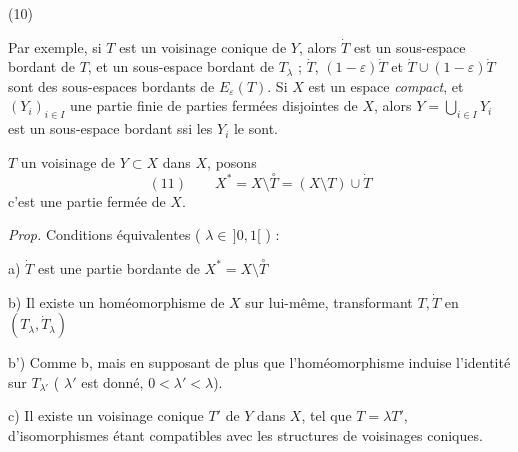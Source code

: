 \documentclass[11pt,a4paper]{article}
\begin{document}

(10)


Par exemple, si $T$ est un voisinage  conique  de \struck{\ill{}} $Y$, alors $\dot T$ est un sous-espace bordant de $T$, et un sous-espace bordant de $T_\lambda$ ;  $\dot T$, $(1-\varepsilon)\dot T$ et $\dot T\cup(1-\varepsilon)\dot T$ sont des sous-espaces bordants de $E_\varepsilon(T)$.  Si $X$ est un espace \emph{compact}, et $(Y_i)_{i\in I}$ une partie finie de parties fermées disjointes de $X$, alors $Y=\bigcup_{i\in I}Y_i$ est un sous-espace bordant ssi les $Y_i$ le sont.



  $T$ un voisinage   de $Y\subset X$ dans $X$, posons
\[
(11)\qquad X^{*}=X\setminus\overset{\circ}{T}=(X\setminus T)\cup\dot T
\]
c'est une partie fermée de $X$. 

\emph{Prop.} Conditions équivalentes ( $\lambda\in\,]0,1[$ ) :

a) $\dot T$ est une partie bordante de $X^{*}=X\setminus\overset{\circ}{T}$

b) Il existe un homéomorphisme de $X$ sur lui-même, transformant $T,\dot T$ en $(T_\lambda,\dot T_\lambda)$

b') Comme b, mais en supposant de plus que l'homéomorphisme induise l'identité sur $T_{\lambda'}$ (  $\lambda'$ est donné, $0<\lambda'<\lambda$).

c) Il existe un voisinage  conique $T'$ de $Y$ dans $X$,  tel que $T=\lambda T'$, d'isomorphismes étant compatibles avec les structures de voisinages coniques.
\end{document}
